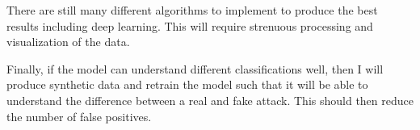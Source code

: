 \documentclass[11pt]{article}
\begin{document}
There are still many different algorithms to implement to produce the best results including deep learning. This will require strenuous processing and visualization of the data. 

Finally, if the model can understand different classifications well, then I will produce synthetic data and retrain the model such that it will be able to understand the difference between a real and fake attack. This should then reduce the number of false positives. 





























\newpage


\end{document}
